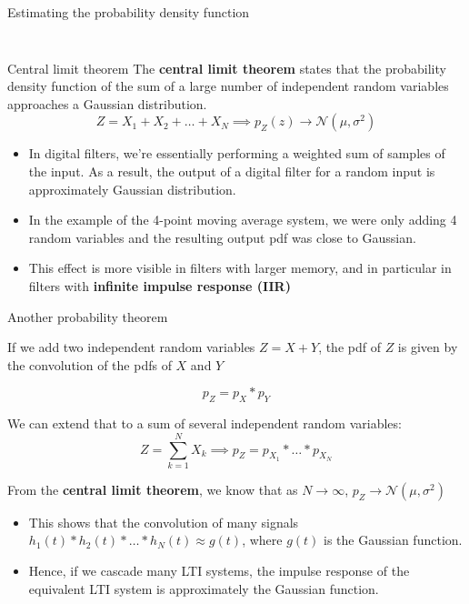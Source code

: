 \documentclass[10pt, handout]{beamer}
\begin{document}
\begin{frame}{Estimating the probability density function}
\begin{columns}
\begin{column}{0.5\textwidth}
\begin{figure}
	\end{figure}		
\end{column}
\end{columns}
\end{frame}

\begin{frame}{Central limit theorem}
The \textbf{central limit theorem} states that the probability density function of the sum of a large number of independent random variables approaches a Gaussian distribution.
\begin{equation*}
Z = X_1 + X_2 + \ldots + X_N \implies p_Z(z) \to\mathcal{N}(\mu, \sigma^2)
\end{equation*}

\begin{itemize}
	\item In digital filters, we're essentially performing a weighted sum of samples of the input. As a result, the output of a digital filter for a random input is approximately Gaussian distribution.
	\item In the example of the 4-point moving average system, we were only adding 4 random variables and the resulting output pdf was close to Gaussian. 
	\item This effect is more visible in filters with larger memory, and in particular in filters with \textbf{infinite impulse response (IIR)} 
\end{itemize}

\end{frame}

\begin{frame}{Another probability theorem}

If we add two independent random variables $Z = X + Y$, the pdf of $Z$ is given by the convolution of the pdfs of $X$ and $Y$

\begin{equation*}
p_Z = p_X \ast p_Y
\end{equation*}

\pause
We can extend that to a sum of several independent random variables:
\begin{equation*}
Z = \sum_{k=1}^N X_k \implies p_Z = p_{X_1} \ast \ldots \ast p_{X_N}
\end{equation*}

\pause
From the \textbf{central limit theorem}, we know that as $N\to\infty$,  $p_Z\to\mathcal{N}(\mu, \sigma^2)$

\begin{itemize}
	\item This shows that the convolution of many signals $h_1(t) \ast h_2(t) \ast \ldots \ast h_N(t) \approx g(t)$, where $g(t)$ is the Gaussian function.
	\item Hence, if we cascade many LTI systems, the impulse response of the equivalent LTI system is approximately the Gaussian function.
\end{itemize}


\end{frame}
\end{document}
